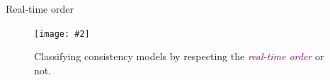 \documentclass{beamer}
\makeatletter
\newcommand{\citeinbeamer}[3]{{\scriptsize{\textcolor{blue}{[#1@#2'#3]}}}}
\newcommand{\fig}[3]
{
  \begin{figure}[htp]
    \centering
      \texttt{[image: \#2]}
      \caption[labelInTOC]{#3}
  \end{figure}
}
\newcommand{\largepurple}[1]{\textcolor{purple}{\large #1}}
\newcommand{\largeblue}[1]{\textcolor{blue}{\large #1}}
\newcommand{\boxedpoint}[1]{
  \begin{center}
    \fbox{\textcolor{red}{\bf #1}}
  \end{center}
}
\makeatother
\begin{document}

\begin{frame}{Real-time order}

  \fig{width = 0.75\textwidth}{fig/consistency-model-with-without-real-time.pdf}
  {Classifying consistency models by respecting the \largepurple{\emph{real-time
  order}} or not.}
\end{frame}
\end{document}
